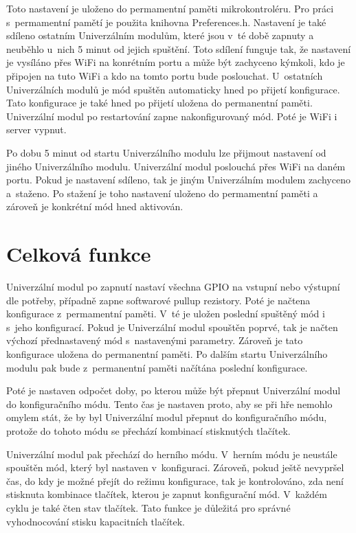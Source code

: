 Toto nastavení je uloženo do permamentní paměti mikrokontroléru. Pro práci s~permamentní pamětí je použita knihovna Preferences.h. Nastavení je také sdíleno ostatním Univerzálním modulům, které jsou v~té době zapnuty 
a neuběhlo u~nich 5 minut od jejich spuštění. Toto sdílení funguje tak, že nastavení je vysíláno přes WiFi na konrétním portu a může být zachyceno kýmkoli, kdo je připojen na tuto WiFi a kdo na tomto portu bude 
poslouchat. U~ostatních Univerzálních modulů je mód spuštěn automaticky hned po přijetí konfigurace. Tato konfigurace je také hned po přijetí uložena do permanentní paměti. Univerzální modul po restartování zapne 
nakonfigurovaný mód. Poté je WiFi i server vypnut. 

Po dobu 5 minut od startu Univerzálního modulu lze přijmout nastavení od jiného Univerzálního modulu. Univerzální modul poslouchá přes WiFi na daném portu. Pokud je nastavení sdíleno, tak je jiným Univerzálním modulem 
zachyceno a~staženo. Po stažení je toho nastavení uloženo do permamentní paměti a zároveň je konkrétní mód hned aktivován. 

\section{Celková funkce}
Univerzální modul po zapnutí nastaví všechna GPIO na vstupní nebo výstupní dle potřeby, případně zapne softwarové pullup rezistory. Poté je načtena konfigurace z~permamentní paměti. V~té je uložen poslední spuštěný 
mód  
i s~jeho konfigurací. Pokud je Univerzální modul spouštěn poprvé, tak je načten výchozí přednastavený mód s~nastavenými parametry. Zároveň je tato konfigurace uložena do permanentní paměti. Po dalším startu 
Univerzálního modulu pak bude z~permanentní paměti načítána poslední konfigurace. 

Poté je nastaven odpočet doby, po kterou může být přepnut Univerzální modul do konfiguračního módu. Tento čas je nastaven proto, aby se při hře nemohlo omylem stát, že by byl Univerzální modul přepnut do 
konfiguračního módu, protože do tohoto módu se přechází kombinací stisknutých tlačítek. 

Univerzální modul pak přechází do herního módu. V~herním módu je neustále spouštěn mód, který byl nastaven v~konfiguraci. Zároveň, pokud ještě nevypršel čas, do kdy je možné přejít do režimu konfigurace, tak 
je kontrolováno, zda není stisknuta kombinace tlačítek, kterou je zapnut konfigurační mód. V~každém cyklu je také čten stav tlačítek. Tato funkce je důležitá pro správné vyhodnocování stisku kapacitních tlačítek. 


